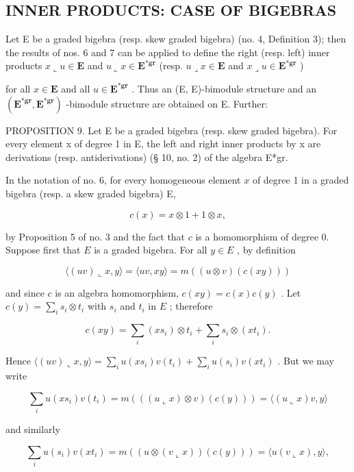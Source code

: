 \subsection{INNER PRODUCTS: CASE OF BIGEBRAS}

Let E be a graded bigebra (resp. skew graded bigebra) (no. 4, Definition 3); then the results of nos. 6 and 7 can be applied to define the right (resp. left) inner products \(x \llcorner u \in \mathbf{E}\) and \(u \llcorner x \in \mathbf{E}^{*\mathbf{gr}}\) (resp. \(u \lrcorner x \in \mathbf{E}\) and \(x \lrcorner u \in \mathbf{E}^{*\mathbf{gr}}\) )

for all \(x \in \mathbf{E}\) and all \(u \in \mathbf{E}^{*\mathbf{gr}}\) . Thus an (E, E)-bimodule structure and an \((\mathbf{E}^{*\mathbf{gr}}, \mathbf{E}^{*\mathbf{gr}})\) -bimodule structure are obtained on E. Further:

PROPOSITION 9. Let E be a graded bigebra (resp. skew graded bigebra). For every element x of degree 1 in E, the left and right inner products by x are derivations (resp. antiderivations) (§ 10, no. 2) of the algebra E*gr.

In the notation of no. 6, for every homogeneous element \(x\) of degree 1 in a graded bigebra (resp. a skew graded bigebra) E,

\[
c (x) = x \otimes 1 + 1 \otimes x,
\]

by Proposition 5 of no. 3 and the fact that \(c\) is a homomorphism of degree 0. Suppose first that \(E\) is a graded bigebra. For all \(y \in E\) , by definition

\[
\langle (u v) \llcorner x, y \rangle = \langle u v, x y \rangle = m ((u \otimes v) (c (x y)))
\]

and since \(c\) is an algebra homomorphism, \(c(xy) = c(x)c(y)\) . Let \(c(y) = \sum_{i} s_i \otimes t_i\) with \(s_i\) and \(t_i\) in \(E\) ; therefore

\[
c (x y) = \sum_ {i} (x s _ {i}) \otimes t _ {i} + \sum_ {i} s _ {i} \otimes (x t _ {i}).
\]

Hence \(\langle (uv) \llcorner x, y \rangle = \sum_{i} u(xs_i)v(t_i) + \sum_{i} u(s_i)v(xt_i)\) . But we may write

\[
\sum_ {i} u (x s _ {i}) v (t _ {i}) = m (((u \llcorner x) \otimes v) (c (y))) = \langle (u \llcorner x) v, y \rangle
\]

and similarly

\[
\sum_ {i} u (s _ {i}) v (x t _ {i}) = m ((u \otimes (v \llcorner x)) (c (y))) = \langle u (v \llcorner x), y \rangle ,
\]

